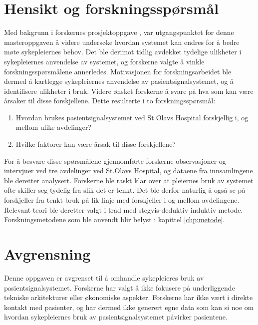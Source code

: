 \section{Hensikt og forskningsspørsmål}
Med bakgrunn i forskernes prosjektoppgave \citep{Sund13}, var utgangspunktet for denne masteroppgaven å videre undersøke hvordan systemet kan endres for å bedre møte sykepleiernes behov. Det ble derimot tidlig avdekket tydelige ulikheter i sykepleiernes anvendelse av systemet, og forskerne valgte å vinkle forskningsspørsmålene annerledes. Motivasjonen for forskningsarbeidet ble dermed å kartlegge sykepleiernes anvendelse av pasientsignalsystemet, og å identifisere ulikheter i bruk. Videre ønsket forskerne å svare på hva som kan være årsaker til disse forskjellene. Dette resulterte i to forskningsspørsmål:

\begin{enumerate}
\item Hvordan brukes pasientsignalsystemet ved St.Olavs Hospital forskjellig i, og mellom ulike avdelinger? 
\item Hvilke faktorer kan være årsak til disse forskjellene?
\end{enumerate}

\noindent
For å besvare disse spørsmålene gjennomførte forskerne observasjoner og intervjuer ved tre avdelinger ved St.Olavs Hospital, og dataene fra innsamlingene ble deretter analysert. Forskerne ble raskt klar over at pleiernes bruk av systemet ofte skiller seg tydelig fra slik det er tenkt. Det ble derfor naturlig å også se på forskjeller fra tenkt bruk på lik linje med forskjeller i og mellom avdelingene. Relevant teori ble deretter valgt i tråd med stegvis-deduktiv induktiv metode. Forskningsmetodene som ble anvendt blir belyst i kapittel \ref{chp:metode}.

\section{Avgrensning}
Denne oppgaven er avgrenset til å omhandle sykepleieres bruk av pasientsignalsystemet. Forskerne har valgt å ikke fokusere på underliggende tekniske arkitekturer eller økonomiske aspekter. Forskerne har ikke vært i direkte kontakt med pasienter, og har dermed ikke generert egne data som kan si noe om hvordan sykepleiernes bruk av pasientsignalsystemet påvirker pasientene. 

